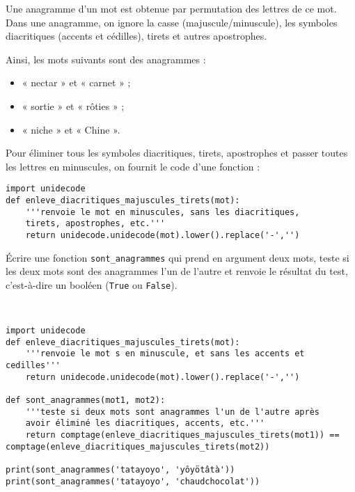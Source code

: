 Une anagramme d'un mot est obtenue par permutation des lettres de ce mot. Dans une anagramme, on ignore la casse (majuscule/minuscule), les symboles diacritiques (accents et cédilles), tirets et autres apostrophes.

Ainsi, les mots suivants sont des anagrammes :
\begin{itemize}
\item « nectar » et « carnet » ;
\item « sortie » et « rôties » ;
\item « niche » et « Chine ».
\end{itemize}

\begin{exercice}
Pour éliminer tous les symboles diacritiques, tirets, apostrophes et passer toutes les lettres en minuscules, on fournit le code d'une fonction :
\begin{verbatim}
import unidecode
def enleve_diacritiques_majuscules_tirets(mot):
    '''renvoie le mot en minuscules, sans les diacritiques,
    tirets, apostrophes, etc.'''
    return unidecode.unidecode(mot).lower().replace('-','')
\end{verbatim}
\end{exercice}

Écrire une fonction \verb?sont_anagrammes? qui prend en argument deux mots, teste si les deux mots sont des anagrammes l'un de l'autre et renvoie le résultat du test, c'est-à-dire un booléen (\texttt{True} ou \texttt{False}).

\begin{solution}~\
\begin{verbatim}
import unidecode
def enleve_diacritiques_majuscules_tirets(mot):
    '''renvoie le mot s en minuscule, et sans les accents et cedilles'''
    return unidecode.unidecode(mot).lower().replace('-','')

def sont_anagrammes(mot1, mot2):
    '''teste si deux mots sont anagrammes l'un de l'autre après
    avoir éliminé les diacritiques, accents, etc.'''
    return comptage(enleve_diacritiques_majuscules_tirets(mot1)) == comptage(enleve_diacritiques_majuscules_tirets(mot2))

print(sont_anagrammes('tatayoyo', 'yôyötâtà'))
print(sont_anagrammes('tatayoyo', 'chaudchocolat'))
\end{verbatim}
\end{solution}


